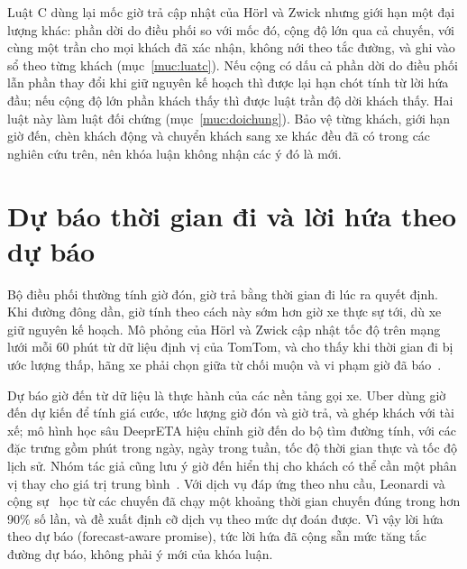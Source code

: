Luật C dùng lại mốc giờ trả cập nhật của Hörl và Zwick nhưng giới hạn một đại lượng khác: phần dời do điều phối so với
mốc đó, cộng độ lớn qua cả chuyến, với cùng một trần cho mọi khách đã xác nhận, không nới theo tắc đường, và ghi vào sổ
theo từng khách (mục~\ref{muc:luatc}). Nếu cộng có dấu cả phần dời do điều phối lẫn phần thay đổi khi giữ nguyên kế
hoạch thì được lại hạn chót tính từ lời hứa đầu; nếu cộng độ lớn phần khách thấy thì được luật trần độ dời khách thấy.
Hai luật này làm luật đối chứng (mục~\ref{muc:doichung}). Bảo vệ từng khách, giới hạn giờ đến, chèn khách động và
chuyển khách sang xe khác đều đã có trong các nghiên cứu trên, nên khóa luận không nhận các ý đó là mới.

\section{Dự báo thời gian đi và lời hứa theo dự báo}
\label{muc:c2-dubao}

Bộ điều phối thường tính giờ đón, giờ trả bằng thời gian đi lúc ra quyết định. Khi đường đông dần, giờ tính theo cách
này sớm hơn giờ xe thực sự tới, dù xe giữ nguyên kế hoạch. Mô phỏng của Hörl và Zwick cập nhật tốc độ trên mạng lưới
mỗi 60 phút từ dữ liệu định vị của TomTom, và cho thấy khi thời gian đi bị ước lượng thấp, hãng xe phải chọn giữa từ
chối muộn và vi phạm giờ đã báo~\cite{horl2022}.

Dự báo giờ đến từ dữ liệu là thực hành của các nền tảng gọi xe. Uber dùng giờ đến dự kiến để tính giá cước, ước lượng
giờ đón và giờ trả, và ghép khách với tài xế; mô hình học sâu DeeprETA hiệu chỉnh giờ đến do bộ tìm đường tính, với
các đặc trưng gồm phút trong ngày, ngày trong tuần, tốc độ thời gian thực và tốc độ lịch sử. Nhóm tác giả cũng lưu ý
giờ đến hiển thị cho khách có thể cần một phân vị thay cho giá trị trung bình~\cite{hu2022}. Với dịch vụ đáp ứng theo
nhu cầu, Leonardi và cộng sự~\cite{leonardi2024} học từ các chuyến đã chạy một khoảng thời gian chuyến đúng trong hơn
90\% số lần, và đề xuất định cỡ dịch vụ theo mức dự đoán được. Vì vậy lời hứa theo dự báo (forecast-aware promise),
tức lời hứa đã cộng sẵn mức tăng tắc đường dự báo, không phải ý mới của khóa luận.

